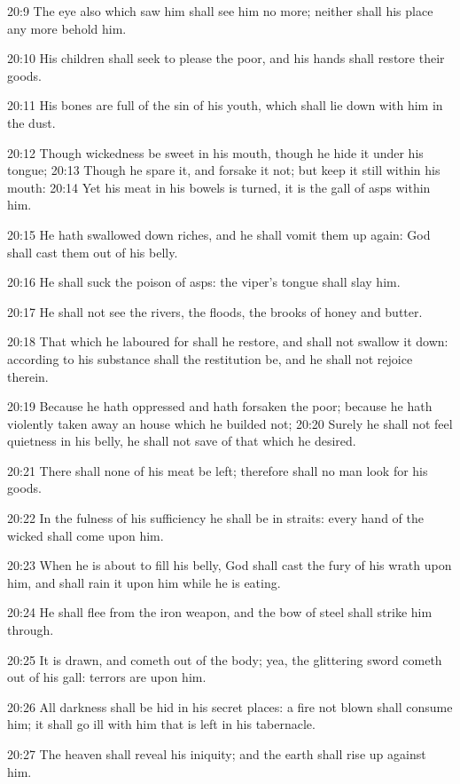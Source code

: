 20:9 The eye also which saw him shall see him no more; neither shall
his place any more behold him.

20:10 His children shall seek to please the poor, and his hands shall
restore their goods.

20:11 His bones are full of the sin of his youth, which shall lie down
with him in the dust.

20:12 Though wickedness be sweet in his mouth, though he hide it under
his tongue; 20:13 Though he spare it, and forsake it not; but keep it
still within his mouth: 20:14 Yet his meat in his bowels is turned, it
is the gall of asps within him.

20:15 He hath swallowed down riches, and he shall vomit them up again:
God shall cast them out of his belly.

20:16 He shall suck the poison of asps: the viper's tongue shall slay
him.

20:17 He shall not see the rivers, the floods, the brooks of honey and
butter.

20:18 That which he laboured for shall he restore, and shall not
swallow it down: according to his substance shall the restitution be,
and he shall not rejoice therein.

20:19 Because he hath oppressed and hath forsaken the poor; because he
hath violently taken away an house which he builded not; 20:20 Surely
he shall not feel quietness in his belly, he shall not save of that
which he desired.

20:21 There shall none of his meat be left; therefore shall no man
look for his goods.

20:22 In the fulness of his sufficiency he shall be in straits: every
hand of the wicked shall come upon him.

20:23 When he is about to fill his belly, God shall cast the fury of
his wrath upon him, and shall rain it upon him while he is eating.

20:24 He shall flee from the iron weapon, and the bow of steel shall
strike him through.

20:25 It is drawn, and cometh out of the body; yea, the glittering
sword cometh out of his gall: terrors are upon him.

20:26 All darkness shall be hid in his secret places: a fire not blown
shall consume him; it shall go ill with him that is left in his
tabernacle.

20:27 The heaven shall reveal his iniquity; and the earth shall rise
up against him.

